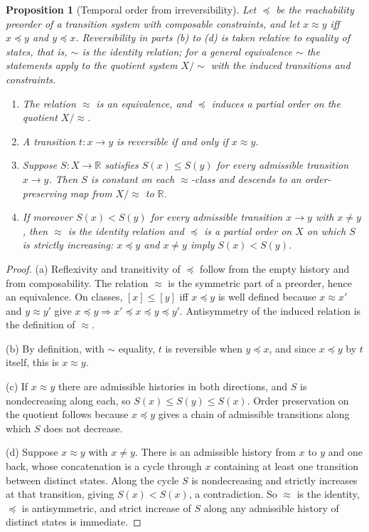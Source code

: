 \documentclass[11pt,twoside,openright]{book}
\theoremstyle{plain}
\newtheorem{proposition}[theorem]{Proposition}
\theoremstyle{definition}
\theoremstyle{remark}
\newcommand{\R}{\mathbb{R}}
\begin{document}
\begin{proposition}[Temporal order from irreversibility]\label{prop:order}
Let $\preceq$ be the reachability preorder of a transition system with composable constraints, and let $x\approx y$ iff $x\preceq y$ and $y\preceq x$. Reversibility in parts (b) to (d) is taken relative to equality of states, that is, $\sim$ is the identity relation; for a general equivalence $\sim$ the statements apply to the quotient system $X/{\sim}$ with the induced transitions and constraints.
\begin{enumerate}
\item[(a)] The relation $\approx$ is an equivalence, and $\preceq$ induces a partial order on the quotient $X/{\approx}$.
\item[(b)] A transition $t:x\to y$ is reversible if and only if $x\approx y$.
\item[(c)] Suppose $S:X\to\R$ satisfies $S(x)\le S(y)$ for every admissible transition $x\to y$. Then $S$ is constant on each $\approx$-class and descends to an order-preserving map from $X/{\approx}$ to $\R$.
\item[(d)] If moreover $S(x)<S(y)$ for every admissible transition $x\to y$ with $x\neq y$, then $\approx$ is the identity relation and $\preceq$ is a partial order on $X$ on which $S$ is strictly increasing: $x\preceq y$ and $x\neq y$ imply $S(x)<S(y)$.
\end{enumerate}
\end{proposition}

\begin{proof}
(a) Reflexivity and transitivity of $\preceq$ follow from the empty history and from composability. The relation $\approx$ is the symmetric part of a preorder, hence an equivalence. On classes, $[x]\le[y]$ iff $x\preceq y$ is well defined because $x\approx x'$ and $y\approx y'$ give $x\preceq y\Rightarrow x'\preceq x\preceq y\preceq y'$. Antisymmetry of the induced relation is the definition of $\approx$.

(b) By definition, with $\sim$ equality, $t$ is reversible when $y\preceq x$, and since $x\preceq y$ by $t$ itself, this is $x\approx y$.

(c) If $x\approx y$ there are admissible histories in both directions, and $S$ is nondecreasing along each, so $S(x)\le S(y)\le S(x)$. Order preservation on the quotient follows because $x\preceq y$ gives a chain of admissible transitions along which $S$ does not decrease.

(d) Suppose $x\approx y$ with $x\neq y$. There is an admissible history from $x$ to $y$ and one back, whose concatenation is a cycle through $x$ containing at least one transition between distinct states. Along the cycle $S$ is nondecreasing and strictly increases at that transition, giving $S(x)<S(x)$, a contradiction. So $\approx$ is the identity, $\preceq$ is antisymmetric, and strict increase of $S$ along any admissible history of distinct states is immediate.
\end{proof}
\end{document}
